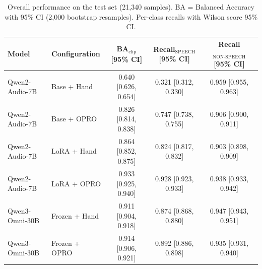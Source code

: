\begin{table}[t]
\centering
\caption{Overall performance on the test set (21,340 samples). BA = Balanced Accuracy with 95\% CI (2,000 bootstrap resamples). Per-class recalls with Wilson score 95\% CI.}
\label{tab:overall_performance}
\footnotesize
\setlength{\tabcolsep}{3pt}
\renewcommand{\arraystretch}{1.12}
\begin{tabular}{llccc}
\toprule
\textbf{Model} & \textbf{Configuration} & \textbf{BA$_{\text{clip}}$ [95\% CI]} & \textbf{Recall$_{\text{SPEECH}}$ [95\% CI]} & \textbf{Recall$_{\text{NON-SPEECH}}$ [95\% CI]} \\
\midrule
Qwen2-Audio-7B & Base + Hand & 0.640 [0.626, 0.654] & 0.321 [0.312, 0.330] & 0.959 [0.955, 0.963] \\
Qwen2-Audio-7B & Base + OPRO & 0.826 [0.814, 0.838] & 0.747 [0.738, 0.755] & 0.906 [0.900, 0.911] \\
Qwen2-Audio-7B & LoRA + Hand & 0.864 [0.852, 0.875] & 0.824 [0.817, 0.832] & 0.903 [0.898, 0.909] \\
Qwen2-Audio-7B & LoRA + OPRO & 0.933 [0.925, 0.940] & 0.928 [0.923, 0.933] & 0.938 [0.933, 0.942] \\
Qwen3-Omni-30B & Frozen + Hand & 0.911 [0.904, 0.918] & 0.874 [0.868, 0.880] & 0.947 [0.943, 0.951] \\
Qwen3-Omni-30B & Frozen + OPRO & 0.914 [0.906, 0.921] & 0.892 [0.886, 0.898] & 0.935 [0.931, 0.940] \\
\bottomrule
\end{tabular}
\end{table}